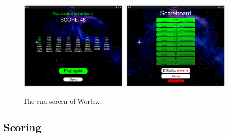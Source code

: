 \documentclass{article}[12pt]
\begin{document}
    \begin{figure}[ht]
        \includegraphics[width=0.49\textwidth]{pictures/endcard.png}
        \includegraphics[width=0.49\textwidth]{pictures/scoreboard.png}
        \caption{The end screen of Wortex}
    \end{figure}

    \subsection*{Scoring}
\end{document}
